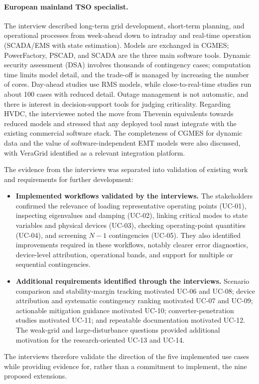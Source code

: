 \paragraph{European mainland TSO specialist.} The interview described long-term grid development, short-term planning, and operational processes from week-ahead down to intraday and real-time operation (SCADA/EMS with state estimation). Models are exchanged in CGMES; PowerFactory, PSCAD, and SCADA are the three main software tools. Dynamic security assessment (DSA) involves thousands of contingency cases; computation time limits model detail, and the trade-off is managed by increasing the number of cores. Day-ahead studies use RMS models, while close-to-real-time studies run about 100 cases with reduced detail. Outage management is not automatic, and there is interest in decision-support tools for judging criticality. Regarding HVDC, the interviewee noted the move from Thevenin equivalents towards reduced models and stressed that any deployed tool must integrate with the existing commercial software stack. The completeness of CGMES for dynamic data and the value of software-independent EMT models were also discussed, with VeraGrid identified as a relevant integration platform.

The evidence from the interviews was separated into validation of existing work and requirements for further development:

\begin{itemize}[before=\leavevmode, leftmargin=*]
  \item \textbf{Implemented workflows validated by the interviews.} The stakeholders confirmed the relevance of loading representative operating points (UC-01), inspecting eigenvalues and damping (UC-02), linking critical modes to state variables and physical devices (UC-03), checking operating-point quantities (UC-04), and screening $N-1$ contingencies (UC-05). They also identified improvements required in these workflows, notably clearer error diagnostics, device-level attribution, operational bands, and support for multiple or sequential contingencies.
  \item \textbf{Additional requirements identified through the interviews.} Scenario comparison and stability-margin tracking motivated UC-06 and UC-08; device attribution and systematic contingency ranking motivated UC-07 and UC-09; actionable mitigation guidance motivated UC-10; converter-penetration studies motivated UC-11; and repeatable documentation motivated UC-12. The weak-grid and large-disturbance questions provided additional motivation for the research-oriented UC-13 and UC-14.
\end{itemize}

The interviews therefore validate the direction of the five implemented use cases while providing evidence for, rather than a commitment to implement, the nine proposed extensions.
